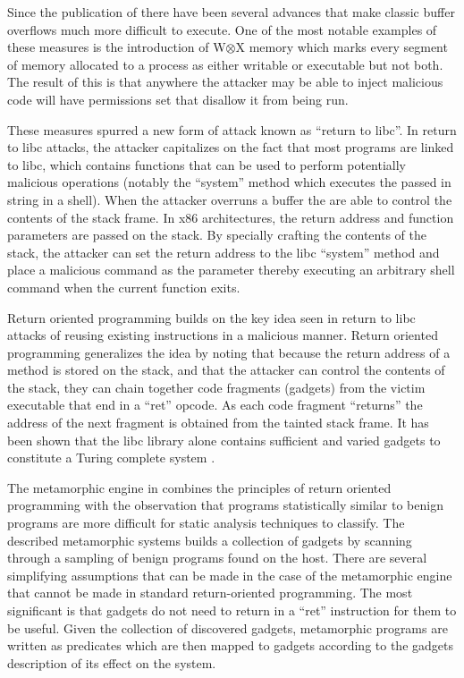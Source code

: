     Since the publication of \cite{aleph} there have been several advances that
    make classic buffer overflows much more difficult to execute. One of the
    most notable examples of these measures is the introduction of W$\otimes$X
    memory which marks every segment of memory allocated to a process as either
    writable or executable but not both. The result of this is that anywhere the
    attacker may be able to inject malicious code will have permissions set that
    disallow it from being run.

    These measures spurred a new form of attack known as ``return to libc''. In
    return to libc attacks, the attacker capitalizes on the fact that most
    programs are linked to libc, which contains functions that can be used to
    perform potentially malicious operations (notably the ``system'' method
    which executes the passed in string in a shell). When the attacker overruns
    a buffer the are able to control the contents of the stack frame.  In x86
    architectures, the return address and function parameters are passed on the
    stack. By specially crafting the contents of the stack, the attacker can set
    the return address to the libc ``system'' method and place a malicious
    command as the parameter thereby executing an arbitrary shell command when
    the current function exits.

    Return oriented programming builds on the key idea seen in return to libc
    attacks of reusing existing instructions in a malicious manner. Return
    oriented programming generalizes the idea by noting that because the return
    address of a method is stored on the stack, and that the attacker can
    control the contents of the stack, they can chain together code fragments
    (gadgets) from the victim executable that end in a ``ret'' opcode. As each
    code fragment ``returns'' the address of the next fragment is obtained from
    the tainted stack frame.  It has been shown that the libc library alone
    contains sufficient and varied gadgets to constitute a Turing complete
    system \cite{rop_geo}.

    The metamorphic engine in \cite{franken} combines the principles of return
    oriented programming with the observation that programs statistically
    similar to benign programs are more difficult for static analysis techniques
    to classify. The described metamorphic systems builds a collection of
    gadgets by scanning through a sampling of benign programs found on the host.
    There are several simplifying assumptions that can be made in the case of
    the metamorphic engine that cannot be made in standard return-oriented
    programming. The most significant is that gadgets do not need to return in a
    ``ret'' instruction for them to be useful. Given the collection of
    discovered gadgets, metamorphic programs are written as predicates which are
    then mapped to gadgets according to the gadgets description of its effect on
    the system.

